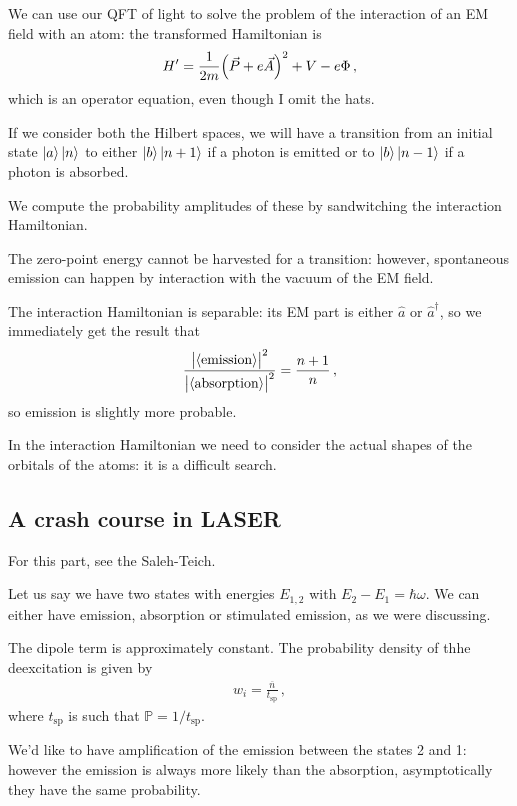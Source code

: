 \documentclass[main.tex]{subfiles}
\begin{document}
We can use our QFT of light to solve the problem of the interaction of an EM field with an atom: the transformed Hamiltonian is 
%
\begin{align}
H' = \frac{1}{2m} \qty(\vec{P} + e \vec{A})^2 + V - e \Phi 
\,,
\end{align}
%
which is an operator equation, even though I omit the hats. 

If we consider both the Hilbert spaces, we will have a transition from an initial state \(\ket{a} \ket{n}\)  to either \(\ket{b} \ket{n+1}\) if a photon is emitted or to \(\ket{b} \ket{n-1}\) if a photon is absorbed. 

We compute the probability amplitudes of these by sandwitching the interaction Hamiltonian. 

The zero-point energy cannot be harvested for a transition: however, spontaneous emission can happen by interaction with the vacuum of the EM field. 

The interaction Hamiltonian is separable: its EM part is either \(\hat{a} \) or \(\hat{a}^\dag\), so we immediately get the result that 
%
\begin{align}
\frac{\abs{\expval{\text{emission}}}^2}{\abs{\expval{\text{absorption}}}^2} = \frac{n+1}{n}
\,,
\end{align}
%
so emission is slightly more probable. 

In the interaction Hamiltonian we need to consider the actual shapes of the orbitals of the atoms: it is a difficult search. 

\subsection{A crash course in LASER}

For this part, see the Saleh-Teich. 

Let us say we have two states with energies \(E_{1, 2}\) with \(E_2 - E_1 = \hbar \omega \). 
We can either have emission, absorption or stimulated emission, as we were discussing. 

The dipole term is approximately constant. 
The probability density of thhe deexcitation is given by 
%
\begin{align}
w_{i} = \frac{\overline{n}  }{t _{\text{sp}}} 
\,,
\end{align}
%
where \(t _{\text{sp}}\) is such that \(\mathbb{P} = 1 / t _{\text{sp}}\). 

We'd like to have amplification of the emission between the states 2 and 1: however the emission is always more likely than the absorption, asymptotically they have the same probability. 
\end{document}
